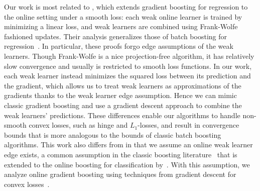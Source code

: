 Our work is most related to \citep{beygelzimer2015online}, which extends gradient boosting for regression to the online setting under a smooth loss: each weak online learner is trained by minimizing a linear loss, and weak learners are combined using Frank-Wolfe~\citep{frank1956algorithm} fashioned updates. Their analysis generalizes those of batch boosting for regression~\citep{zhang:2005}. In particular, these proofs forgo edge assumptions of the weak learners. 
Though Frank-Wolfe is a nice projection-free algorithm, it has relatively slow convergence and usually is restricted to smooth loss functions. 
In our work, each weak learner instead minimizes the squared loss between its prediction and the gradient, which allows us to treat weak learners as approximations of the gradients thanks to the weak learner edge assumption. Hence we can mimic classic gradient boosting and use a gradient descent approach to combine the weak learners' predictions.
These differences enable our algorithms to handle non-smooth convex losses, such as hinge and $L_1$-losses, and result in convergence bounds that is more analogous to the bounds of classic batch boosting algorithms. 
This work also differs from \citep{beygelzimer2015online} in that we assume an online weak learner edge exists, a common assumption in the classic boosting literature~\citep{freund1995desicion, freund1999intro2boost} that is extended to the online boosting for classification by~\citep{lu:2012,beygelzimer2015optimal}. With this assumption, we analyze online gradient boosting using techniques from gradient descent for convex losses~\citep{hazan2007logarithmic}. 




